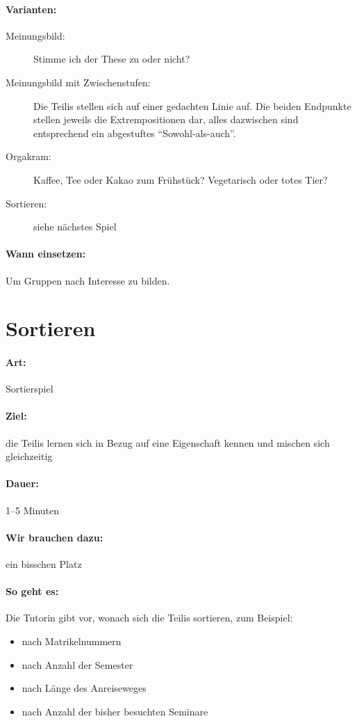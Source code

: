 \paragraph{Varianten:}
  \begin{description}
    \item[Meinungsbild:] Stimme ich der These zu oder nicht?
    \item[Meinungsbild mit Zwischenstufen:] Die Teilis stellen sich auf einer gedachten Linie auf. Die beiden Endpunkte stellen jeweils die Extrempositionen dar, alles dazwischen sind entsprechend ein abgestuftes "`Sowohl-als-auch"'.
    \item [Orgakram:] Kaffee, Tee oder Kakao zum Frühstück? Vegetarisch oder totes Tier?
    \item[Sortieren:] siehe nächstes Spiel
  \end{description}
\paragraph{Wann einsetzen:} Um Gruppen nach Interesse zu bilden.

\section{Sortieren}
\label{sortieren}
\paragraph{Art:} Sortierspiel
\paragraph{Ziel:} die Teilis lernen sich in Bezug auf eine Eigenschaft kennen und mischen sich gleichzeitig
\paragraph{Dauer:} 1--5 Minuten
\paragraph{Wir brauchen dazu:} ein bisschen Platz
\paragraph{So geht es:} Die Tutorin gibt vor, wonach sich die Teilis sortieren, zum Beispiel:
  \begin{itemize}
    \item nach Matrikelnummern
    \item nach Anzahl der Semester
    \item nach Länge des Anreiseweges
    \item nach Anzahl der bisher besuchten Seminare
  \end{itemize}
